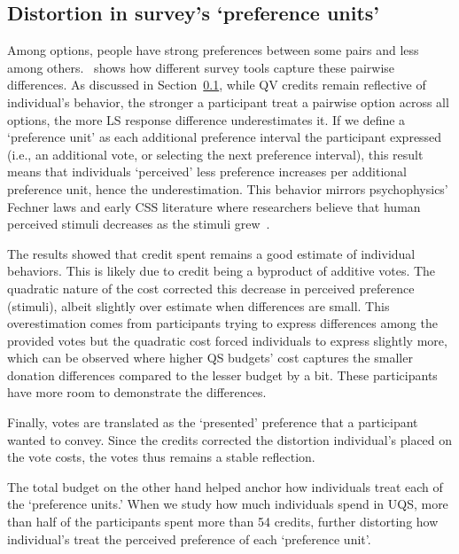 \subsection{Distortion in survey's `preference units'}
Among options, people have strong preferences between some pairs and less among others.~ shows how different survey tools capture these pairwise differences. As discussed in Section~\ref{}, while QV credits remain reflective of individual's behavior, the stronger a participant treat a pairwise option across all options, the more LS response difference underestimates it. If we define a `preference unit' as each additional preference interval the participant expressed (i.e., an additional vote, or selecting the next preference interval), this result means that individuals `perceived' less preference increases per additional preference unit, hence the underestimation. This behavior mirrors psychophysics' Fechner laws and early CSS literature where researchers believe that human perceived stimuli decreases as the stimuli grew~\cite{}.

The results showed that credit spent remains a good estimate of individual behaviors. This is likely due to credit being a byproduct of additive votes. The quadratic nature of the cost corrected this decrease in perceived preference (stimuli), albeit slightly over estimate when differences are small. This overestimation comes from participants trying to express differences among the provided votes but the quadratic cost forced individuals to express slightly more, which can be observed where higher QS budgets' cost captures the smaller donation differences compared to the lesser budget by a bit. These participants have more room to demonstrate the differences.

Finally, votes are translated as the `presented' preference that a participant wanted to convey. Since the credits corrected the distortion individual's placed on the vote costs, the votes thus remains a stable reflection. 

The total budget on the other hand helped anchor how individuals treat each of the `preference units.' When we study how much individuals spend in UQS, more than half of the participants spent more than 54 credits, further distorting how individual's treat the perceived preference of each `preference unit'.

